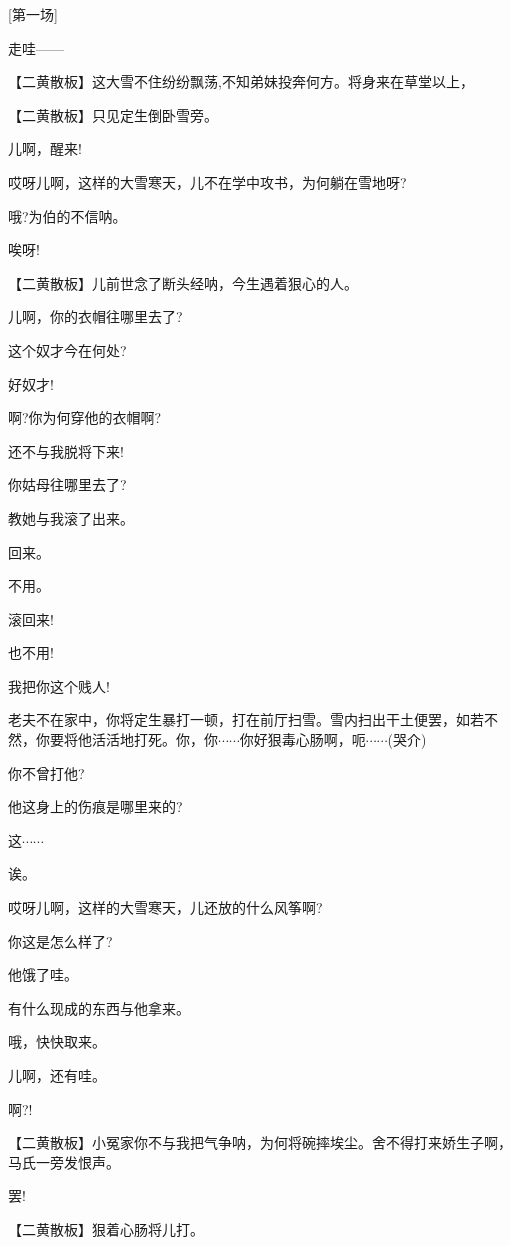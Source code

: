 {{[}第一场{]}}

{走哇------}

\setlength{\hangindent}{60pt} {【{\akai 二黄散板}】这大雪不住纷纷飘荡,不知弟妹投奔何方。将身来在草堂以上，}

\setlength{\hangindent}{60pt} {【{\akai 二黄散板}】只见定生倒卧雪旁。}

{儿啊，醒来!}

{哎呀儿啊，这样的大雪寒天，儿不在学中攻书，为何躺在雪地呀?}

{哦?为伯的不信呐。}

{唉呀!}

\setlength{\hangindent}{60pt} {【{\akai 二黄散板}】儿前世念了断头经呐，今生遇着狠心的人。}

{儿啊，你的衣帽往哪里去了?}

{这个奴才今在何处?}

{好奴才!}

{啊?你为何穿他的衣帽啊?}

{还不与我脱将下来!}

{你姑母往哪里去了?}

{教她与我滚了出来。}

{回来。}

{不用。}

{滚回来!}

{也不用!}

{我把你这个贱人!}

{老夫不在家中，你将定生暴打一顿，打在前厅扫雪。雪内扫出干土便罢，如若不然，你要将他活活地打死。你，你$\cdots{}\cdots{}$你好狠毒心肠啊，呃$\cdots{}\cdots{}$(哭介)}

{你不曾打他?}

{他这身上的伤痕是哪里来的?}

{这$\cdots{}\cdots{}$}

{诶。}

{哎呀儿啊，这样的大雪寒天，儿还放的什么风筝啊?}

{你这是怎么样了?}

{他饿了哇。}

{有什么现成的东西与他拿来。}

{哦，快快取来。}

{儿啊，还有哇。}

{啊?!}

\setlength{\hangindent}{60pt} {【{\akai 二黄散板}】小冤家你不与我把气争呐，为何将碗摔埃尘。舍不得打来娇生子啊，马氏一旁发恨声。}

{罢!}

\setlength{\hangindent}{60pt} {【{\akai 二黄散板}】狠着心肠将儿打。}

